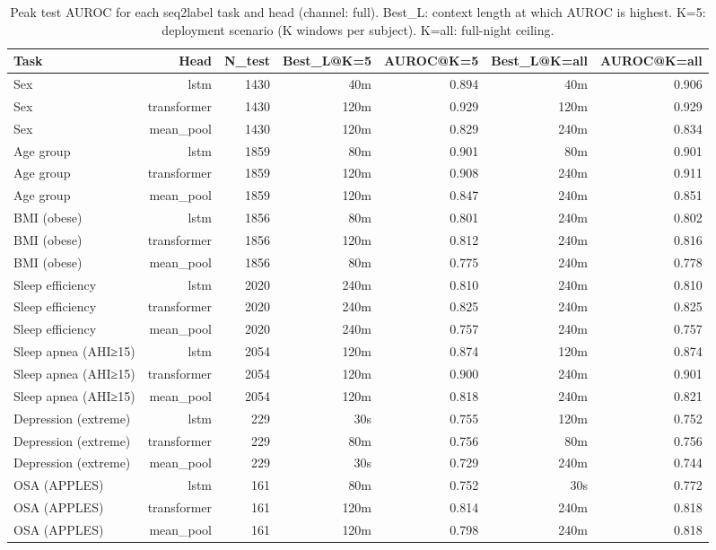 \begin{table}[ht]
\centering
\caption{Peak test AUROC for each seq2label task and head (channel: full). Best\_L: context length at which AUROC is highest. K=5: deployment scenario (K windows per subject). K=all: full-night ceiling.}
\label{tab:peak_auroc_full}
\begin{tabular}{lrrrrrr}
\toprule
Task & Head & N_test & Best_L@K=5 & AUROC@K=5 & Best_L@K=all & AUROC@K=all \\
\midrule
Sex & lstm & 1430 & 40m & 0.894 & 40m & 0.906 \\
Sex & transformer & 1430 & 120m & 0.929 & 120m & 0.929 \\
Sex & mean_pool & 1430 & 120m & 0.829 & 240m & 0.834 \\
Age group & lstm & 1859 & 80m & 0.901 & 80m & 0.901 \\
Age group & transformer & 1859 & 120m & 0.908 & 240m & 0.911 \\
Age group & mean_pool & 1859 & 120m & 0.847 & 240m & 0.851 \\
BMI (obese) & lstm & 1856 & 80m & 0.801 & 240m & 0.802 \\
BMI (obese) & transformer & 1856 & 120m & 0.812 & 240m & 0.816 \\
BMI (obese) & mean_pool & 1856 & 80m & 0.775 & 240m & 0.778 \\
Sleep efficiency & lstm & 2020 & 240m & 0.810 & 240m & 0.810 \\
Sleep efficiency & transformer & 2020 & 240m & 0.825 & 240m & 0.825 \\
Sleep efficiency & mean_pool & 2020 & 240m & 0.757 & 240m & 0.757 \\
Sleep apnea (AHI≥15) & lstm & 2054 & 120m & 0.874 & 120m & 0.874 \\
Sleep apnea (AHI≥15) & transformer & 2054 & 120m & 0.900 & 240m & 0.901 \\
Sleep apnea (AHI≥15) & mean_pool & 2054 & 120m & 0.818 & 240m & 0.821 \\
Depression (extreme) & lstm & 229 & 30s & 0.755 & 120m & 0.752 \\
Depression (extreme) & transformer & 229 & 80m & 0.756 & 80m & 0.756 \\
Depression (extreme) & mean_pool & 229 & 30s & 0.729 & 240m & 0.744 \\
OSA (APPLES) & lstm & 161 & 80m & 0.752 & 30s & 0.772 \\
OSA (APPLES) & transformer & 161 & 120m & 0.814 & 240m & 0.818 \\
OSA (APPLES) & mean_pool & 161 & 120m & 0.798 & 240m & 0.818 \\
\bottomrule
\end{tabular}
\end{table}